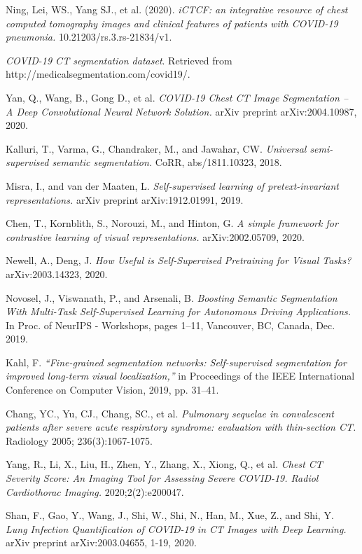 \begin{thebibliography}{1}
	 Ning, Lei, WS., Yang SJ., et al. (2020). \textit{iCTCF: an integrative resource of chest computed tomography images and clinical features of patients with COVID-19 pneumonia.} 10.21203/rs.3.rs-21834/v1.
	
	 \textit{COVID-19 CT segmentation dataset}. Retrieved from http://medicalsegmentation.com/covid19/.
	
	 Yan, Q., Wang, B., Gong D., et al. \textit{COVID-19 Chest CT Image Segmentation – A Deep Convolutional Neural Network Solution.} arXiv preprint arXiv:2004.10987, 2020.

	
	 Kalluri, T., Varma, G., Chandraker, M., and Jawahar, CW. \textit{Universal semi-supervised semantic segmentation.} CoRR, abs/1811.10323, 2018.
	
	 Misra, I., and van der Maaten, L.\textit{ Self-supervised learning of pretext-invariant representations.} arXiv preprint arXiv:1912.01991, 2019.
	
	 Chen, T., Kornblith, S., Norouzi, M., and Hinton, G. \textit{A simple framework for contrastive learning of visual representations.} arXiv:2002.05709, 2020.
	
	 Newell, A., Deng, J. \textit{How Useful is Self-Supervised Pretraining for Visual Tasks?} arXiv:2003.14323, 2020.
	
	 Novosel, J., Viswanath, P., and Arsenali, B. \textit{Boosting Semantic Segmentation With Multi-Task Self-Supervised Learning for Autonomous Driving Applications.} In Proc. of NeurIPS - Workshops, pages 1–11, Vancouver, BC, Canada, Dec. 2019.
	
	 Kahl, F. \textit{“Fine-grained segmentation networks: Self-supervised segmentation for improved long-term visual localization,”} in Proceedings of the IEEE International Conference on Computer Vision, 2019, pp. 31–41.
	
	 Chang, YC., Yu, CJ., Chang, SC., et al. \textit{Pulmonary sequelae in convalescent patients after severe acute respiratory syndrome: evaluation with thin-section CT.} Radiology 2005; 236(3):1067-1075.
	
	 Yang, R., Li, X., Liu, H., Zhen, Y., Zhang, X., Xiong, Q., et al. \textit{Chest CT Severity Score: An Imaging Tool for Assessing Severe COVID-19. Radiol Cardiothorac Imaging.} 2020;2(2):e200047.
	
	 Shan, F., Gao, Y., Wang, J., Shi, W., Shi, N., Han, M., Xue, Z., and Shi, Y. \textit{Lung Infection Quantification of COVID-19 in CT Images with Deep Learning.} arXiv preprint arXiv:2003.04655, 1-19, 2020.


\end{thebibliography}
